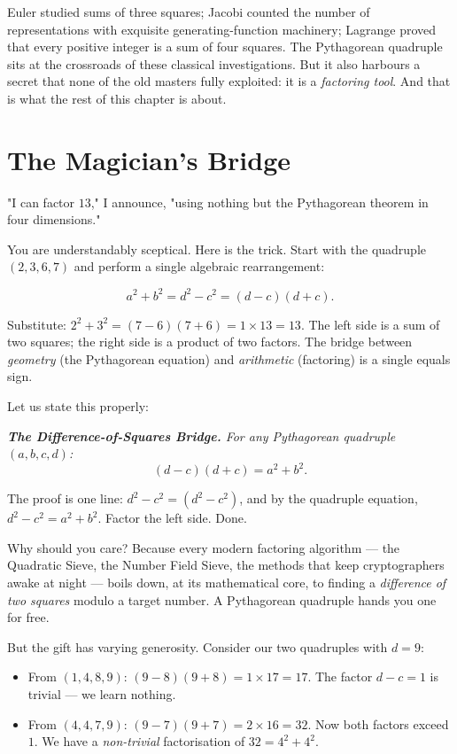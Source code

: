 \documentclass[11pt,openright,twoside]{book}
\renewenvironment{quotation}{%
  \par\vspace{8pt}%
  \begin{list}{}{%
    \setlength{\leftmargin}{2em}%
    \setlength{\rightmargin}{2em}%
  }\item[]\itshape\color{pullquote}%
}{%
  \end{list}%
  \par\vspace{8pt}%
}
\theoremstyle{definition}
\begin{document}
Euler studied sums of three squares; Jacobi counted the number of representations with exquisite generating-function machinery; Lagrange proved that every positive integer is a sum of four squares. The Pythagorean quadruple sits at the crossroads of these classical investigations. But it also harbours a secret that none of the old masters fully exploited: it is a \textit{factoring tool}. And that is what the rest of this chapter is about.


\bigskip


\section{The Magician's Bridge}

"I can factor $13$," I announce, "using nothing but the Pythagorean theorem in four dimensions."

You are understandably sceptical. Here is the trick. Start with the quadruple $(2, 3, 6, 7)$ and perform a single algebraic rearrangement:

\[a^2 + b^2 = d^2 - c^2 = (d - c)(d + c).\]

Substitute: $2^2 + 3^2 = (7 - 6)(7 + 6) = 1 \times 13 = 13$. The left side is a sum of two squares; the right side is a product of two factors. The bridge between \textit{geometry} (the Pythagorean equation) and \textit{arithmetic} (factoring) is a single equals sign.

Let us state this properly:

\begin{quotation}
\noindent\itshape \textbf{The Difference-of-Squares Bridge.} For any Pythagorean quadruple $(a, b, c, d)$: $$(d - c)(d + c) = a^2 + b^2.$$
\end{quotation}

The proof is one line: $d^2 - c^2 = (d^2 - c^2)$, and by the quadruple equation, $d^2 - c^2 = a^2 + b^2$. Factor the left side. Done.

Why should you care? Because every modern factoring algorithm --- the Quadratic Sieve, the Number Field Sieve, the methods that keep cryptographers awake at night --- boils down, at its mathematical core, to finding a \textit{difference of two squares} modulo a target number. A Pythagorean quadruple hands you one for free.

But the gift has varying generosity. Consider our two quadruples with $d = 9$:

\begin{itemize}[leftmargin=*]
\item From $(1, 4, 8, 9)$: $(9 - 8)(9 + 8) = 1 \times 17 = 17$. The factor $d - c = 1$ is trivial --- we learn nothing.
\item From $(4, 4, 7, 9)$: $(9 - 7)(9 + 7) = 2 \times 16 = 32$. Now both factors exceed $1$. We have a \textit{non-trivial} factorisation of $32 = 4^2 + 4^2$.
\end{itemize}
\end{document}
